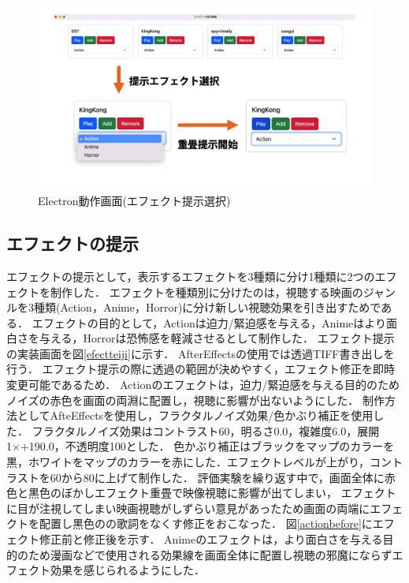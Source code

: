 \begin{figure}[H]
   \centering
   \includegraphics[width=17cm]{images/chapter3/efect_setumei.png}
   \caption{Electron動作画面(エフェクト提示選択)}
   \label{efectsentaku}
\end{figure}
 



\subsection{エフェクトの提示}\label{show_effect}


エフェクトの提示として，表示するエフェクトを3種類に分け1種類に2つのエフェクトを制作した．
エフェクトを種類別に分けたのは，視聴する映画のジャンルを3種類(Action，Anime，Horror)に分け新しい視聴効果を引き出すためである．
エフェクトの目的として，Actionは迫力/緊迫感を与える，Animeはより面白さを与える，Horrorは恐怖感を軽減させるとして制作した．
エフェクト提示の実装画面を図\ref{efectteiji}に示す．
AfterEffectsの使用では透過TIFF書き出しを行う．
エフェクト提示の際に透過の範囲が決めやすく，エフェクト修正を即時変更可能であるため．
Actionのエフェクトは，迫力/緊迫感を与える目的のためノイズの赤色を画面の両淵に配置し，視聴に影響が出ないようにした．
制作方法としてAfteEffectsを使用し，フラクタルノイズ効果/色かぶり補正を使用した．
フラクタルノイズ効果はコントラスト60，明るさ0.0，複雑度6.0，展開1×+190.0，不透明度100とした．
色かぶり補正はブラックをマップのカラーを黒，ホワイトをマップのカラーを赤にした．エフェクトレベルが上がり，コントラストを60から80に上げて制作した．
評価実験を繰り返す中で，画面全体に赤色と黒色のぼかしエフェクト重畳で映像視聴に影響が出てしまい，
エフェクトに目が注視してしまい映画視聴がしずらい意見があったため画面の両端にエフェクトを配置し黒色のの歌詞をなくす修正をおこなった．
図\ref{actionbefore}にエフェクト修正前と修正後を示す．
Animeのエフェクトは，より面白さを与える目的のため漫画などで使用される効果線を画面全体に配置し視聴の邪魔にならずエフェクト効果を感じられるようにした．
 

